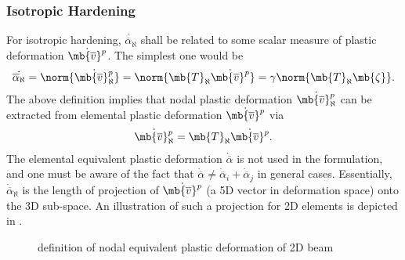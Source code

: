 \subsubsection{Isotropic Hardening}
For isotropic hardening, $\dot{\overline{\alpha}_\aleph}$ shall be related to some scalar measure of plastic deformation $\dot{\mb{\overline{v}}^p}$. The simplest one would be
\begin{gather}\label{eq:nm_alpha}
\dot{\overline{\alpha}_\aleph}=\norm{\dot{\mb{\overline{v}}^p_\aleph}}=\norm{\mb{T}_\aleph\dot{\mb{\overline{v}}^p}}=\gamma\norm{\mb{T}_\aleph\mb{\zeta}}.
\end{gather}
The above definition implies that nodal plastic deformation $\dot{\mb{\overline{v}}^p_\aleph}$ can be extracted from elemental plastic deformation $\dot{\mb{\overline{v}}^p}$ via
\begin{gather}
\dot{\mb{\overline{v}}^p_\aleph}=\mb{T}_\aleph\dot{\mb{\overline{v}}^p}.
\end{gather}
The elemental equivalent plastic deformation $\dot{\overline{\alpha}}$ is not used in the formulation, and one must be aware of the fact that $\dot{\overline{\alpha}}\neq\dot{\overline{\alpha}}_i+\dot{\overline{\alpha}}_j$ in general cases. Essentially, $\dot{\overline{\alpha}}_\aleph$ is the length of projection of $\dot{\mb{\overline{v}}^p}$ (a 5D vector in deformation space) onto the 3D sub-space. An illustration of such a projection for 2D elements is depicted in .
\begin{figure}[H]
\centering\footnotesize
{}
\caption{definition of nodal equivalent plastic deformation of 2D beam}\label{fig:nm_alpha}
\end{figure}


